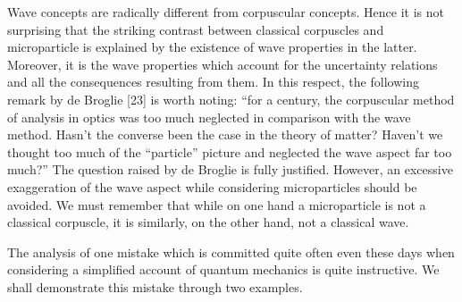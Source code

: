 \documentclass[a4paper,sfsidenotes,colorlinks=true]{tufte-book}
\numberwithin{equation}{section}
\numberwithin{figure}{section}
\begin{document}
Wave concepts are radically different from corpuscular concepts. Hence
it is not surprising that the striking contrast between classical
corpuscles and microparticle is explained by the existence of wave
properties in the latter. Moreover, it is the wave properties which
account for the uncertainty relations and all the consequences
resulting from them. In this respect, the following remark by de
Broglie [23] is worth noting: ``for a century, the corpuscular method
of analysis in optics was too much neglected in comparison with the
wave method. Hasn't the converse been the case in the theory of
matter?  Haven't we thought too much of the ``particle'' picture and
neglected the wave aspect far too much?'' The question raised by de
Broglie is fully justified. However, an excessive exaggeration of the
wave aspect while considering microparticles should be avoided. We
must remember that while on one hand a microparticle is not a
classical corpuscle, it is similarly, on the other hand, not a
classical wave.

The  analysis of one
mistake which is committed quite often even these days when
considering a simplified account of quantum mechanics is quite
instructive. We shall demonstrate this mistake through two examples.
\end{document}

